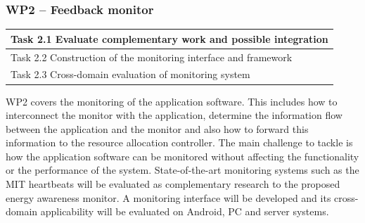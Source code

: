 \documentclass{article}
\begin{document}
\subsubsection{WP2 -- Feedback monitor}
\begin{table}
\vspace{-0.5cm}
\small
\begin{tabular}{ | l |}
\hline
Task 2.1 Evaluate complementary work and possible integration  \\ \hline
Task 2.2 Construction of the monitoring interface and framework   \\ \hline
Task 2.3 Cross-domain evaluation of monitoring system	\\ \hline
\end{tabular}
\vspace{-0.3cm}
\end{table}
WP2 covers the monitoring of the application software.
This includes how to interconnect the monitor with the application, determine the information flow between the application and the monitor and also how to forward this information to the resource allocation controller.
The main challenge to tackle is how the application software can be monitored without affecting the functionality or the performance of the system.
State-of-the-art monitoring systems such as the MIT heartbeats \cite{Hoffmann:10} will be evaluated as complementary research to the proposed energy awareness monitor.
A monitoring interface will be developed and its cross-domain applicability will be evaluated on Android, PC and server systems.
\end{document}
